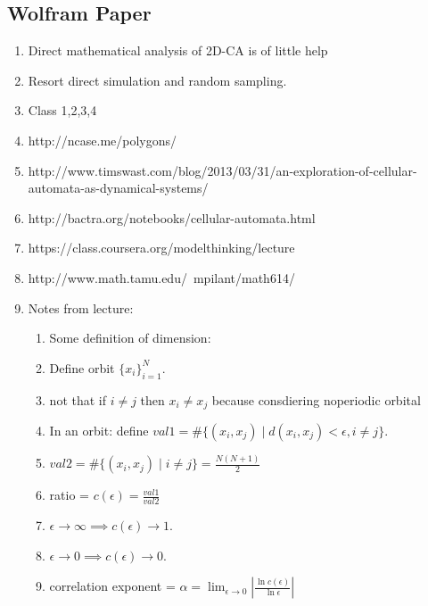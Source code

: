 \documentclass[11pt]{article}
\begin{document}
    \subsection{Wolfram Paper}
        \begin{enumerate}
            \item Direct mathematical analysis of 2D-CA is of little help
            \item Resort direct simulation and random sampling.
            \item Class 1,2,3,4
            \item http://ncase.me/polygons/
            \item http://www.timswast.com/blog/2013/03/31/an-exploration-of-cellular-automata-as-dynamical-systems/
            \item http://bactra.org/notebooks/cellular-automata.html
            \item https://class.coursera.org/modelthinking/lecture
            \item http://www.math.tamu.edu/~mpilant/math614/
            \item Notes from lecture:
                \begin{enumerate}
                    \item Some definition of dimension:
                    \item Define orbit $\{x_i\}_{i=1}^N$.
                    \item not that if $i \neq j$ then $x_i \neq x_j$ because consdiering noperiodic orbital
                    \item In an orbit: define $val1 = \# \{ (x_i,x_j) \mid d(x_i,x_j) < \epsilon, i \neq j\}$. 
                    \item $ val2 = \# \{(x_i, x_j) \mid  i \neq j\} =  \frac{N(N+1)}{2}$
                    \item ratio = $c(\epsilon) = \frac{val1}{val2}$
                    \item $\epsilon \to \infty \implies c(\epsilon) \to 1$. 
                    \item $\epsilon \to 0 \implies c(\epsilon) \to 0$. 
                    \item correlation exponent = $\alpha = \lim_{\epsilon \to 0} |\frac{\ln c(\epsilon) }{\ln \epsilon}|$

\end{enumerate}
\end{enumerate}
\end{document}

